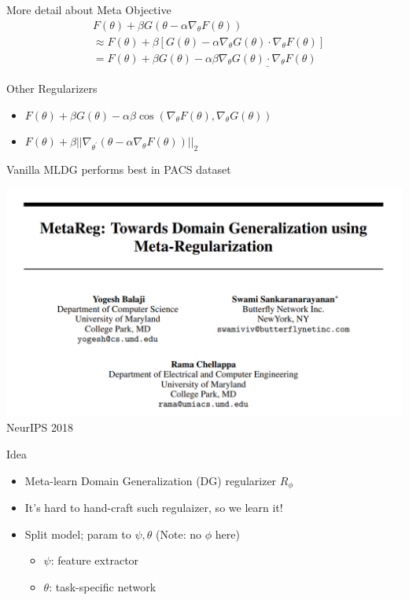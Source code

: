 \documentclass{beamer}
\begin{document}
\begin{frame}{More detail about Meta Objective}
  \begin{equation*}
    \begin{aligned}
      & F(\theta) + \beta G(\theta - \alpha \nabla_\theta F(\theta))  \\
      &\approx F(\theta) + \beta[G(\theta) - \alpha \nabla_\theta G(\theta) \cdot \nabla_\theta F(\theta)] \\
      &= F(\theta) + \beta G(\theta) - \alpha \beta \underline{\nabla_\theta G(\theta) \cdot \nabla_\theta F(\theta)}
    \end{aligned}
  \end{equation*}
\end{frame}

\begin{frame}[t]{Other Regularizers}
  \begin{itemize}
    \item $F(\theta) + \beta G(\theta) - \alpha \beta \cos(\nabla_\theta F(\theta), \nabla_\theta G(\theta))$
    \item $F(\theta) + \beta ||\nabla_{\theta^\prime} (\theta - \alpha \nabla_\theta F(\theta))||_2$
  \end{itemize}

  \vspace{2em}
  Vanilla MLDG performs best in PACS dataset
\end{frame}

\begin{frame}
  \includegraphics[width=\textwidth]{fig/MetaReg.png}
  \center NeurIPS 2018
\end{frame}

\begin{frame}{Idea}
  \begin{itemize}
    \item Meta-learn Domain Generalization (DG) regularizer $R_\phi$
    \item It's hard to hand-craft such regulaizer, so we learn it!
    \item Split model; param to $\psi, \theta$ (Note: no $\phi$ here)
      \begin{itemize}
        \item $\psi$: feature extractor
        \item $\theta$: task-specific network
      \end{itemize}
  \end{itemize}
\end{frame}
\end{document}

